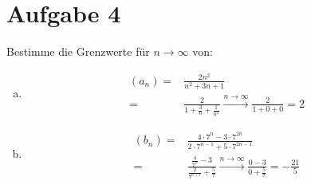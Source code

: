 \documentclass{scrreprt}
\begin{document}
	\section*{Aufgabe 4}
		Bestimme die Grenzwerte für $n \to \infty$ von:
			\begin{enumerate}[(a)]
				\item
					\begin{align*}
						(a_n) =& \frac{2n^2}{n^2 + 3n + 1}\\
						= & \frac{2}{1 + \frac{3}{n} + \frac{1}{n^2}} \xrightarrow{n \to \infty} \frac{2}{1 + 0 + 0} = 2
					\end{align*}
				\item
					\begin{align*}
						(b_n) =& \frac{4 \cdot 7^n  - 3 \cdot 7^{2n}}{2 \cdot 7^{n-1} + 5 \cdot 7^{2n -1}}\\
						= & \frac{\frac{4}{7^n}  - 3 }{\frac{2}{7^{n+1}} + \frac{5}{7}} \xrightarrow{n \to \infty} \frac{0 - 3}{0 + \frac{5}{7}} = -\frac{21}{5}
					\end{align*}
			\end{enumerate}
\end{document}
